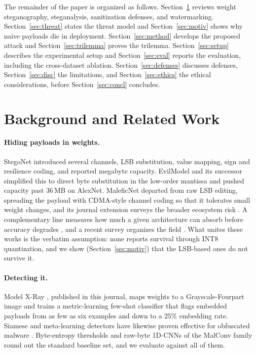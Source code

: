 \documentclass[10pt,journal]{IEEEtran}
\theoremstyle{remark}
\begin{document}
The remainder of the paper is organized as follows. Section~\ref{sec:related} reviews
weight steganography, steganalysis, sanitization defenses, and watermarking.
Section~\ref{sec:threat} states the threat model and Section~\ref{sec:motiv} shows why
naive payloads die in deployment. Section~\ref{sec:method} develops the proposed attack
and Section~\ref{sec:trilemma} proves the trilemma. Section~\ref{sec:setup} describes
the experimental setup and Section~\ref{sec:eval} reports the evaluation, including the
cross-dataset ablation. Section~\ref{sec:defenses} discusses defenses,
Section~\ref{sec:disc} the limitations, and Section~\ref{sec:ethics} the ethical
considerations, before Section~\ref{sec:concl} concludes.

\section{Background and Related Work}\label{sec:related}
\paragraph{Hiding payloads in weights.} StegoNet \cite{liu2020stegonet} introduced
several channels, LSB substitution, value mapping, sign and resilience coding,
and reported megabyte capacity. EvilModel \cite{wang2021evilmodel} and its successor
\cite{wang2022evilmodel2} simplified this to direct byte substitution in the
low-order mantissa and pushed capacity past $36$\,MB on AlexNet. MaleficNet
\cite{hitaj2022maleficnet} departed from raw LSB editing, spreading the payload with
CDMA-style channel coding so that it tolerates small weight changes, and its journal
extension surveys the broader ecosystem risk \cite{hitaj2025trust}. A complementary
line measures how much a given architecture can absorb before accuracy degrades
\cite{agrawal2023stegcapacity,zhang2023stegcapacity}, and a recent survey organizes
the field \cite{chaganti2021stegomalware}. What unites these works is the verbatim
assumption: none reports survival through INT8 quantization, and we show
(Section~\ref{sec:motiv}) that the LSB-based ones do not survive it.

\paragraph{Detecting it.} Model X-Ray \cite{gilkarov2026modelxray}, published in this
journal, maps weights to a Grayscale-Fourpart image and trains a metric-learning
few-shot classifier \cite{snell2017prototypical,vinyals2016matching} that flags
embedded payloads from as few as six examples and down to a $25\%$ embedding rate.
Siamese and meta-learning detectors have likewise proven effective for obfuscated
malware \cite{zhu2023taskaware}. Byte-entropy thresholds and raw-byte 1D-CNNs of the
MalConv family round out the standard baseline set, and we evaluate against all of
them.
\end{document}
